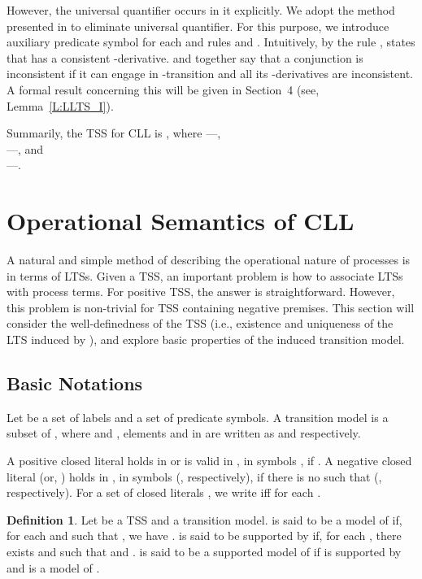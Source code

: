 \documentclass{elsarticle}
\theoremstyle{plain}
\theoremstyle{definition}
\newtheorem{mydefn}[theorem]{Definition}
\begin{document}
However, the universal quantifier occurs in it explicitly.
We adopt the method presented in \cite{Verhoef95} to eliminate universal quantifier.
For this purpose, we introduce auxiliary predicate symbol  for each  and rules  and .
Intuitively, by the rule ,  states that  has a consistent -derivative.
 and  together say that a conjunction is inconsistent if it can engage in -transition and all its -derivatives are inconsistent. A formal result concerning this will be given in Section~4 (see, Lemma~\ref{L:LLTS_I}).

Summarily, the TSS for CLL is , where ---,\\
---, and \\
---.



\section{Operational Semantics of CLL}
A natural and simple method of describing the operational nature of processes is in terms of LTSs. Given a TSS, an important problem is how to associate LTSs with process terms. For positive TSS, the answer is straightforward.
However, this problem is non-trivial for TSS containing negative premises. This section will consider the well-definedness of the TSS  (i.e., existence and uniqueness of the LTS induced by ), and explore basic properties of the induced transition model.
\subsection{Basic Notations}

Let  be a set of labels and    a set of predicate symbols. A transition model  is a subset of , where  and , elements  and  in  are written as  and  respectively.


     A positive closed literal  holds in  or  is valid in , in symbols , if . A negative closed literal   (or, ) holds in , in symbols  (, respectively), if there is no  such that (, respectively). For a set of closed literals , we write  iff  for each .

\begin{mydefn}
Let  be a TSS and  a transition model.
     is said to be a model of  if, for each  and  such that , we have .
     is said to be supported by  if, for each , there exists  and  such that  and .
     is said to be a supported model of  if  is supported by  and  is a model of .
\end{mydefn}
\end{document}
